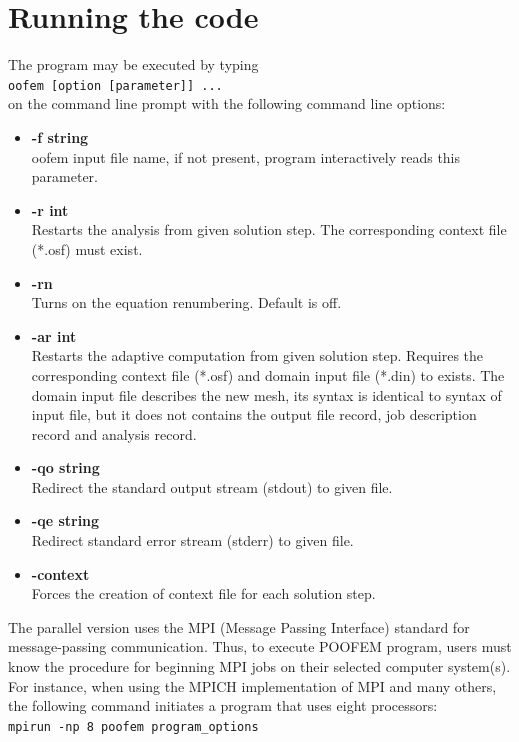 \documentclass[a4paper]{article}
\newcommand{\Pmode}[1]{{\sffamily #1}}
\begin{document}
\section{Running the code}
\label{_running_the_code}
The program may be executed by typing\\
\texttt{oofem [option [parameter]] ...}\\
on the command line prompt with the following command line options:
\begin{itemize}
\item
\textbf{-f string}\\ oofem input file name, if not present, program interactively
reads this parameter.
\item
\textbf{-r int}\\
Restarts the analysis from given solution step. The corresponding
context file (*.osf) must exist.
\item
\textbf{-rn}\\
Turns on the equation renumbering. Default is off.
\item
\textbf{-ar int}\\
Restarts the adaptive computation from given solution step.
Requires the corresponding context file (*.osf) and domain input file
(*.din) to exists. The domain input file describes the new mesh, its
syntax is identical to syntax of input file, but it does not contains
the output file record, job description record and analysis record.
\item
\textbf{-qo string}\\
Redirect the standard output stream (stdout) to given file.
\item
\textbf{-qe string}\\
Redirect standard error stream (stderr) to given file.
\item
\textbf{-context}\\
Forces the creation of context file for each solution step.
\end{itemize}

\Pmode{
The parallel version uses the MPI (Message Passing Interface) standard for message-passing communication. Thus, to execute POOFEM program,
users must know the procedure for beginning MPI jobs on their selected computer system(s).
For instance, when using the MPICH implementation of MPI and many others, the following command initiates a program that uses eight processors: \\[2mm]
\texttt{mpirun -np 8 poofem program\_options}
}
\end{document}
